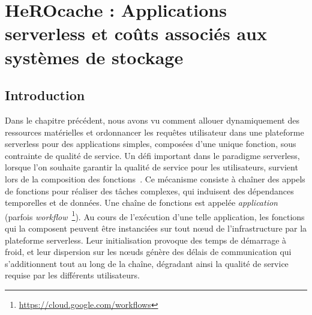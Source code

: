 \chapter{HeROcache : Applications serverless et coûts associés aux systèmes de stockage}
\label{chapter:herocache}


\section{Introduction}
\label{section:herocache-introduction}

Dans le chapitre précédent, nous avons vu comment allouer dynamiquement des ressources matérielles et ordonnancer les requêtes utilisateur dans une plateforme serverless pour des applications simples, composées d'une unique fonction, sous contrainte de qualité de service. Un défi important dans le paradigme serverless, lorsque l'on souhaite garantir la qualité de service pour les utilisateurs, survient lors de la composition des fonctions~\cite{burckhardtNetheriteEfficientExecution}. Ce mécanisme consiste à chaîner des appels de fonctions pour réaliser des tâches complexes, qui induisent des dépendances temporelles et de données. Une chaîne de fonctions est appelée \textit{application} (parfois \textit{workflow}~\footnote{\href{https://cloud.google.com/workflows}{https://cloud.google.com/workflows}}). Au cours de l'exécution d'une telle application, les fonctions qui la composent peuvent être instanciées sur tout nœud de l'infrastructure par la plateforme serverless. Leur initialisation provoque des temps de démarrage à froid, et leur dispersion sur les nœuds génère des délais de communication qui s'additionnent tout au long de la chaîne, dégradant ainsi la qualité de service requise par les différents utilisateurs.


